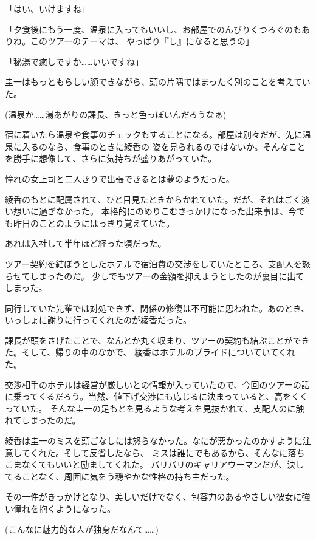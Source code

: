 ﻿\documentclass[
    book,tate,
    line_length=30zw,
    jafontsize=12pt,
    paper=b5j,
    landscape,
    ]{jlreq}
\begin{document}
「はい、いけますね」

「夕食後にもう一度、温泉に入ってもいいし、お部屋でのんびりくつろぐのもありね。このツアーのテーマは、
やっぱり『し』になると思うの」

「秘湯で癒しですか……いいですね」

圭一はもっともらしい顔できながら、頭の片隅ではまったく別のことを考えていた。

(温泉か……湯あがりの課長、きっと色っぽいんだろうなぁ)

宿に着いたら温泉や食事のチェックもすることになる。部屋は別々だが、先に温泉に入るのなら、食事のときに綾香の
姿を見られるのではないか。そんなことを勝手に想像して、さらに気持ちが盛りあがっていた。

憧れの女上司と二人きりで出張できるとは夢のようだった。

綾香のもとに配属されて、ひと目見たときからかれていた。だが、それはごく淡い想いに過ぎなかった。
本格的にのめりこむきっかけになった出来事は、今でも昨日のことのようにはっきり覚えていた。

あれは入社して半年ほど経った頃だった。

ツアー契約を結ぼうとしたホテルで宿泊費の交渉をしていたところ、支配人を怒らせてしまったのだ。
少しでもツアーの金額を抑えようとしたのが裏目に出てしまった。

同行していた先輩では対処できず、関係の修復は不可能に思われた。あのとき、いっしょに謝りに行ってくれたのが綾香だった。

課長が頭をさげたことで、なんとか丸く収まり、ツアーの契約も結ぶことができた。そして、帰りの車のなかで、
綾香はホテルのプライドについていてくれた。

交渉相手のホテルは経営が厳しいとの情報が入っていたので、今回のツアーの話に乗ってくるだろう。当然、値下げ交渉にも応じるに決まっていると、高をくくっていた。
そんな圭一の足もとを見るような考えを見抜かれて、支配人のに触れてしまったのだ。

綾香は圭一のミスを頭ごなしには怒らなかった。なにが悪かったのかすように注意してくれた。そして反省したなら、 
ミスは誰にでもあるから、そんなに落ちこまなくてもいいと励ましてくれた。
バリバリのキャリアウーマンだが、決してることなく、周囲に気をう穏やかな性格の持ち主だった。

その一件がきっかけとなり、美しいだけでなく、包容力のあるやさしい彼女に強い憧れを抱くようになった。

(こんなに魅力的な人が独身だなんて……)
\end{document}
